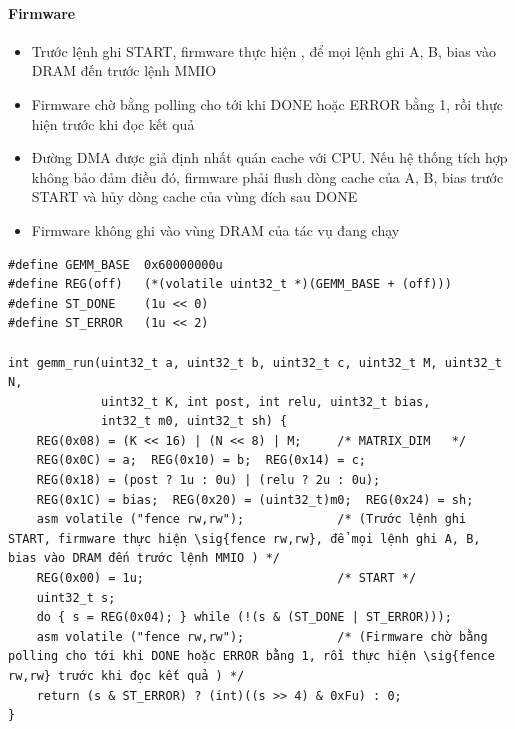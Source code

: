 \paragraph{Firmware}\label{tab:3-6}
\begin{itemize}
\item Trước lệnh ghi START, firmware thực hiện , để mọi lệnh ghi A, B, bias vào DRAM đến trước lệnh MMIO
\item Firmware chờ bằng polling cho tới khi DONE hoặc ERROR bằng 1, rồi thực hiện  trước khi đọc kết quả
\item Đường DMA được giả định nhất quán cache với CPU. Nếu hệ thống tích hợp không bảo đảm điều đó, firmware phải flush dòng cache của A, B, bias trước START và hủy dòng cache của vùng đích sau DONE
\item Firmware không ghi vào vùng DRAM của tác vụ đang chạy
\end{itemize}


\begin{Verbatim}[frame=leftline,framerule=2pt,rulecolor=\color{brand},xleftmargin=6pt,samepage=true]
#define GEMM_BASE  0x60000000u
#define REG(off)   (*(volatile uint32_t *)(GEMM_BASE + (off)))
#define ST_DONE    (1u << 0)
#define ST_ERROR   (1u << 2)

int gemm_run(uint32_t a, uint32_t b, uint32_t c, uint32_t M, uint32_t N,
             uint32_t K, int post, int relu, uint32_t bias,
             int32_t m0, uint32_t sh) {
    REG(0x08) = (K << 16) | (N << 8) | M;     /* MATRIX_DIM   */
    REG(0x0C) = a;  REG(0x10) = b;  REG(0x14) = c;
    REG(0x18) = (post ? 1u : 0u) | (relu ? 2u : 0u);
    REG(0x1C) = bias;  REG(0x20) = (uint32_t)m0;  REG(0x24) = sh;
    asm volatile ("fence rw,rw");             /* (Trước lệnh ghi START, firmware thực hiện \sig{fence rw,rw}, để mọi lệnh ghi A, B, bias vào DRAM đến trước lệnh MMIO ) */
    REG(0x00) = 1u;                           /* START */
    uint32_t s;
    do { s = REG(0x04); } while (!(s & (ST_DONE | ST_ERROR)));
    asm volatile ("fence rw,rw");             /* (Firmware chờ bằng polling cho tới khi DONE hoặc ERROR bằng 1, rồi thực hiện \sig{fence rw,rw} trước khi đọc kết quả ) */
    return (s & ST_ERROR) ? (int)((s >> 4) & 0xFu) : 0;
}
\end{Verbatim}


